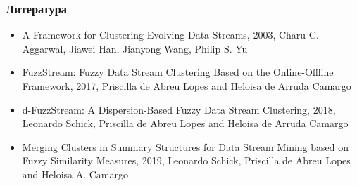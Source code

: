 \documentclass{beamer}
\begin{document}
\begin{frame}
    \frametitle{Литература}
    
    \begin{itemize}
        \item A Framework for Clustering Evolving Data Streams, 2003, Charu C. Aggarwal, Jiawei Han, Jianyong Wang, Philip S. Yu
        \item FuzzStream: Fuzzy Data Stream Clustering Based on the Online-Offline Framework, 2017, Priscilla de Abreu Lopes and Heloisa de Arruda Camargo
        \item d-FuzzStream: A Dispersion-Based Fuzzy Data Stream Clustering, 2018, Leonardo Schick, Priscilla de Abreu Lopes and Heloisa de Arruda Camargo
        \item Merging Clusters in Summary Structures for Data Stream Mining based on Fuzzy Similarity Measures, 2019, Leonardo Schick, Priscilla de Abreu Lopes and Heloisa A. Camargo
    \end{itemize}
    
\end{frame}
\end{document}
